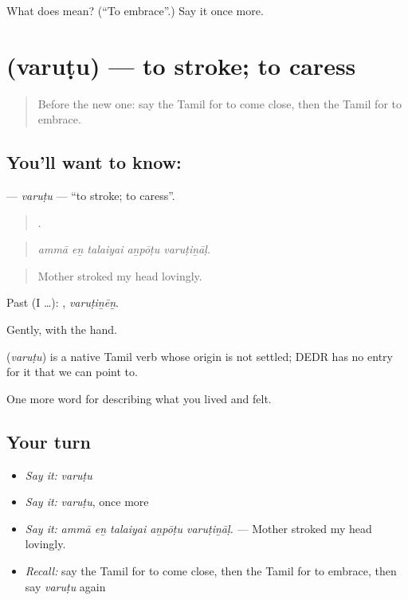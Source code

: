 \begin{tcolorbox}[breakable,colback=teal!4,colframe=teal!35!black,title={Before you move on}]
What does  mean? (\textquotedblleft{}To embrace\textquotedblright{}.) Say it once more.
\end{tcolorbox}
\section[\texorpdfstring{\ta{வருடு} (varuṭu)}{வருடு (varuṭu)}]{ (varuṭu) — to stroke; to caress}

\label{lesson:TA-C502-varutu}



\begin{quote}
Before the new one: say the Tamil for to come close, then the Tamil for to embrace.
\end{quote}

\subsection*{You'll want to know: }
\textbf{} — \emph{varuṭu} — \textquotedblleft{}to stroke; to caress\textquotedblright{}.

\begin{quote}
    .
\end{quote}

\begin{quote}
\emph{ammā eṉ talaiyai aṉpōṭu varuṭiṉāḷ.}
\end{quote}

\begin{quote}
Mother stroked my head lovingly.
\end{quote}

Past (I …): , \emph{varuṭiṉēṉ}.

Gently, with the hand.

\begin{cousinweb}
\textbf{} (\emph{varuṭu}) is a native Tamil verb whose origin is not settled; DEDR has no entry for it that we can point to.
\end{cousinweb}

\begin{grammarlens}[title={What you've built}]
One more word for describing what you lived and felt.
\end{grammarlens}

\subsection*{Your turn}
\begin{itemize}
\raggedright
  \item \emph{Say it:} \emph{varuṭu}
  \item \emph{Say it:} \emph{varuṭu}, once more
  \item \emph{Say it:} \emph{ammā eṉ talaiyai aṉpōṭu varuṭiṉāḷ.} — Mother stroked my head lovingly.
  \item \emph{Recall:} say the Tamil for to come close, then the Tamil for to embrace, then say \emph{varuṭu} again
\end{itemize}

